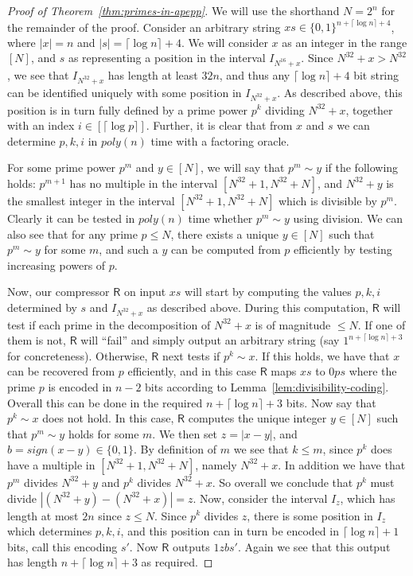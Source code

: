 \documentclass[11pt]{article}
\newcommand{\B}{\{0,1\}}
\begin{document}
\begin{proof}[Proof of Theorem~\ref{thm:primes-in-apepp}]
We will use the shorthand $N = 2^n$ for the remainder of the proof. Consider an arbitrary string $xs \in \B^{n + \lceil \log n \rceil + 4}$, where $|x| = n$ and $|s| = \lceil\log n\rceil + 4$. We will consider $x$ as an integer in the range $[N]$, and $s$ as representing a position in the interval $I_{N^{16} + x}$. Since $N^{32} + x > N^{32}$, we see that $I_{N^{32}+x}$ has length at least $32n$, and thus any $\lceil \log n \rceil + 4$ bit string can be identified uniquely with some position in $I_{N^{32}+x}$. As described above, this position is in turn fully defined by a prime power $p^k$ dividing $N^{32} + x$, together with an index $i \in [\lceil \log p \rceil]$. Further, it is clear that from $x$ and $s$ we can determine $p,k,i$ in $poly(n)$ time with a factoring oracle.

For some prime power $p^m$ and $y \in [N]$, we will say that $p^m \sim y$ if the following holds: $p^{m+1}$ has no multiple in the interval $[N^{32}+1, N^{32}+N]$, and $N^{32}+y$ is the smallest integer in the interval $[N^{32}+1, N^{32}+N]$ which is divisible by $p^m$. Clearly it can be tested in $poly(n)$ time whether $p^m \sim y$ using division. We can also see that for any prime $p \leq N$, there exists a unique $y \in [N]$ such that $p^m \sim y$ for some $m$, and such a $y$ can be computed from $p$ efficiently by testing increasing powers of $p$.

Now, our compressor $\mathsf{R}$ on input $xs$ will start by computing the values $p,k,i$ determined by $s$ and $I_{N^{32}+x}$ as described above. During this computation, $\mathsf{R}$ will test if each prime in the decomposition of $N^{32} + x$ is of magnitude $\leq N$. If one of them is not, $\mathsf{R}$ will ``fail'' and simply output an arbitrary string (say $1^{n + \lceil \log n\rceil + 3}$ for concreteness). Otherwise, $\mathsf{R}$ next tests if $p^k \sim x$. If this holds, we have that $x$ can be recovered from $p$ efficiently, and in this case $\mathsf{R}$ maps $xs$ to $0ps$ where the prime $p$ is encoded in $n - 2$ bits according to Lemma~\ref{lem:divisibility-coding}. Overall this can be done in the required $n + \lceil \log n \rceil + 3$ bits. Now say that $p^k \sim x$ does not hold. In this case, $\mathsf{R}$ computes the unique integer $y \in [N]$ such that $p^m \sim y$ holds for some $m$. We then set $z = |x-y|$, and $b = sign(x-y) \in \{0,1\}$. By definition of $m$ we see that $k \leq m$, since $p^k$ does have a multiple in $[N^{32} + 1, N^{32} + N]$, namely $N^{32} + x$. In addition we have that $p^m$ divides $N^{32} +y$ and $p^k$ divides $N^{32} + x$. So overall we conclude that $p^k$ must divide $|(N^{32} + y) - (N^{32} + x)| = z$. Now, consider the interval $I_z$, which has length at most $2n$ since $z \leq N$. Since $p^k$ divides $z$, there is some position in $I_z$ which determines $p,k,i$, and this position can in turn be encoded in $\lceil \log n \rceil + 1$ bits, call this encoding $s'$. Now $\mathsf{R}$ outputs $1zbs'$. Again we see that this output has length $n + \lceil \log n \rceil + 3$ as required.


\end{proof}
\end{document}
